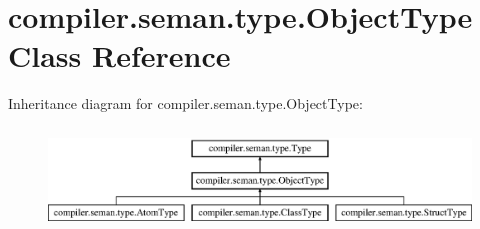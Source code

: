 \hypertarget{classcompiler_1_1seman_1_1type_1_1_object_type}{}\section{compiler.\+seman.\+type.\+Object\+Type Class Reference}
\label{classcompiler_1_1seman_1_1type_1_1_object_type}
Inheritance diagram for compiler.\+seman.\+type.\+Object\+Type\+:\begin{figure}[H]
\begin{center}
\leavevmode
\includegraphics[height=2.731707cm]{classcompiler_1_1seman_1_1type_1_1_object_type}
\end{center}
\end{figure}
